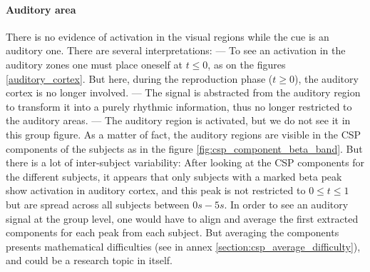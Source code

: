 \paragraph{Auditory area}

There is no evidence of activation in the visual regions while the cue is an auditory one. There are several interpretations:
— To see an activation in the auditory zones one must place oneself at $t \leq 0$, as on the figures \ref{auditory_cortex}. But here, during the reproduction phase ($t \geq 0$), the auditory cortex is no longer involved.
— The signal is abstracted from the auditory region to transform it into a purely rhythmic information, thus no longer restricted to the auditory areas.
— The auditory region is activated, but we do not see it in this group figure. As a matter of fact, the auditory regions are visible in the CSP components of the subjects as in the figure \ref{fig:csp_component_beta_band}. But there is a lot of inter-subject variability: After looking at the CSP components for the different subjects, it appears that only subjects with a marked beta peak show activation in auditory cortex, and this peak is not restricted to $0 \leq t \leq 1$ but are spread across all subjects between $0s - 5s$. In order to see an auditory signal at the group level, one would have to align and average the first extracted components for each peak from each subject. But averaging the components presents mathematical difficulties (see in annex \ref{section:csp_average_difficulty}), and could be a research topic in itself.




